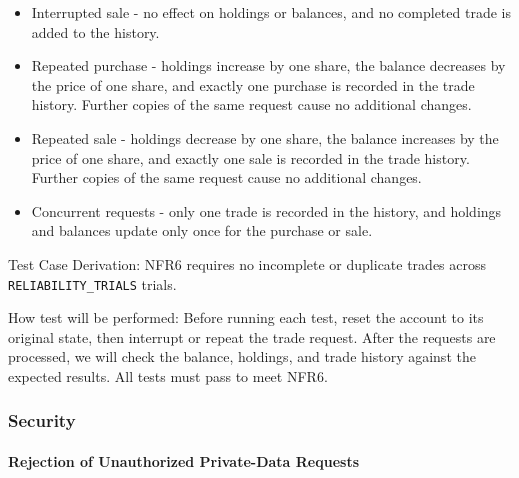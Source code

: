 \documentclass[12pt, titlepage]{article}
\begin{document}
\begin{enumerate}
\begin{itemize}
    \item Interrupted sale - no effect on holdings or balances,
    and no completed trade is added to the history.

    \item Repeated purchase - holdings increase by one share,
    the balance decreases by the price of one share, and exactly
    one purchase is recorded in the trade history. Further copies
    of the same request cause no additional changes.

    \item Repeated sale - holdings decrease by one share,
    the balance increases by the price of one share, and exactly
    one sale is recorded in the trade history. Further copies
    of the same request cause no additional changes.

    \item Concurrent requests - only one trade is recorded in
    the history, and holdings and balances update only once
    for the purchase or sale.
\end{itemize}

Test Case Derivation: NFR6 requires no incomplete or duplicate trades
across \texttt{RELIABILITY\_TRIALS}  trials.

How test will be performed: Before running each test, reset the account
to its original state, then interrupt or repeat the trade request.
After the requests are processed, we will check the balance, holdings,
and trade history against the expected results. All tests must pass
to meet NFR6.

\end{enumerate}

\subsubsection{Security}

\paragraph{Rejection of Unauthorized Private-Data Requests}
\end{document}
